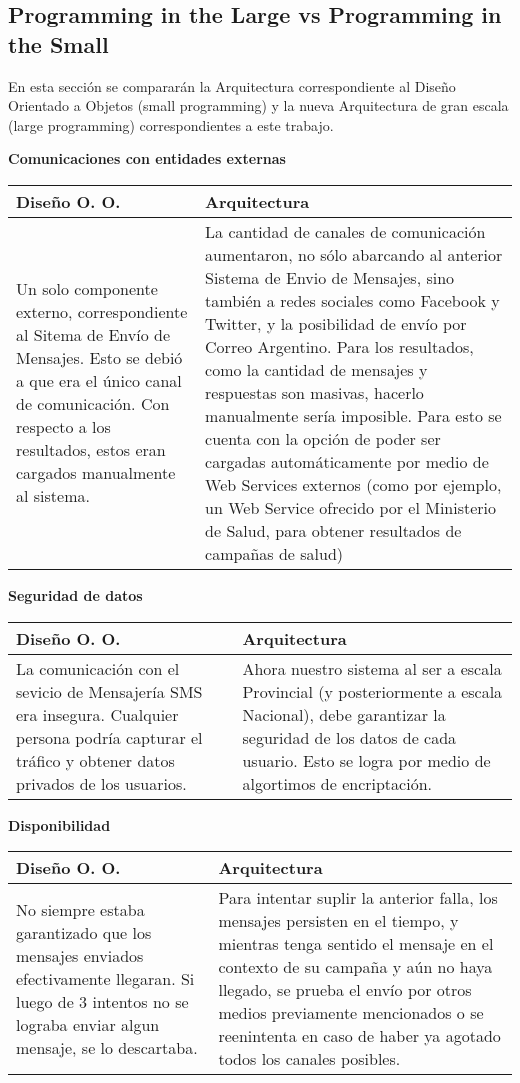 \subsection{Programming in the Large vs Programming in the Small}

En esta secci\'on se comparar\'an la Arquitectura correspondiente al Dise\~no Orientado a Objetos (small programming) y la nueva Arquitectura de gran escala (large programming) correspondientes a este trabajo.


{\bf Comunicaciones con entidades externas} \\
\begin{tabular}{| p{8cm} | p{8cm} |}
\hline
Dise\~no O. O. & Arquitectura \\ \hline \hline
Un solo componente externo, correspondiente al Sitema de Env\'io de Mensajes. Esto se debi\'o a que era el \'unico canal de comunicaci\'on. Con respecto a los resultados, estos eran cargados manualmente al sistema. & La cantidad de canales de comunicaci\'on aumentaron, no s\'olo abarcando al anterior Sistema de Envio de Mensajes, sino tambi\'en a redes sociales como Facebook y Twitter, y la posibilidad de env\'io por Correo Argentino. Para los resultados, como la cantidad de mensajes y respuestas son masivas, hacerlo manualmente ser\'ia imposible. Para esto se cuenta con la opci\'on de poder ser cargadas autom\'aticamente por medio de Web Services externos (como por ejemplo, un Web Service ofrecido por el Ministerio de Salud, para obtener resultados de campa\~nas de salud) \\ \hline
\end{tabular}

{\bf Seguridad de datos} \\
\begin{tabular}{| p{8cm} | p{8cm} |}
\hline
Dise\~no O. O. & Arquitectura \\ \hline \hline

La comunicaci\'on con el sevicio de Mensajer\'ia SMS era insegura. Cualquier persona podr\'ia capturar el tr\'afico y obtener datos privados de los usuarios. & Ahora nuestro sistema al ser a escala Provincial (y posteriormente a escala Nacional), debe garantizar la seguridad de los datos de cada usuario. Esto se logra por medio de algortimos de encriptaci\'on. \\ \hline
\end{tabular}


{\bf Disponibilidad} \\
\begin{tabular}{| p{8cm} | p{8cm} |}
\hline
Dise\~no O. O. & Arquitectura \\ \hline \hline

No siempre estaba garantizado que los mensajes enviados efectivamente llegaran. Si luego de 3 intentos no se lograba enviar algun mensaje, se lo descartaba. & Para intentar suplir la anterior falla, los mensajes persisten en el tiempo, y mientras tenga sentido el mensaje en el contexto de su campa\~na y a\'un no haya llegado, se prueba el env\'io por otros medios previamente mencionados o se reenintenta en caso de haber ya agotado todos los canales posibles. \\ \hline
\end{tabular}

